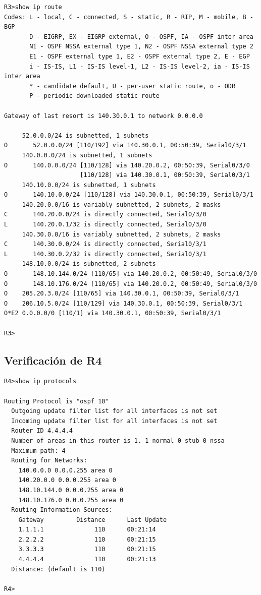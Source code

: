 \documentclass[12pt,a4paper]{article}
\begin{document}
\begin{verbatim}
R3>show ip route
Codes: L - local, C - connected, S - static, R - RIP, M - mobile, B - BGP
       D - EIGRP, EX - EIGRP external, O - OSPF, IA - OSPF inter area
       N1 - OSPF NSSA external type 1, N2 - OSPF NSSA external type 2
       E1 - OSPF external type 1, E2 - OSPF external type 2, E - EGP
       i - IS-IS, L1 - IS-IS level-1, L2 - IS-IS level-2, ia - IS-IS inter area
       * - candidate default, U - per-user static route, o - ODR
       P - periodic downloaded static route

Gateway of last resort is 140.30.0.1 to network 0.0.0.0

     52.0.0.0/24 is subnetted, 1 subnets
O       52.0.0.0/24 [110/192] via 140.30.0.1, 00:50:39, Serial0/3/1
     140.0.0.0/24 is subnetted, 1 subnets
O       140.0.0.0/24 [110/128] via 140.20.0.2, 00:50:39, Serial0/3/0
                     [110/128] via 140.30.0.1, 00:50:39, Serial0/3/1
     140.10.0.0/24 is subnetted, 1 subnets
O       140.10.0.0/24 [110/128] via 140.30.0.1, 00:50:39, Serial0/3/1
     140.20.0.0/16 is variably subnetted, 2 subnets, 2 masks
C       140.20.0.0/24 is directly connected, Serial0/3/0
L       140.20.0.1/32 is directly connected, Serial0/3/0
     140.30.0.0/16 is variably subnetted, 2 subnets, 2 masks
C       140.30.0.0/24 is directly connected, Serial0/3/1
L       140.30.0.2/32 is directly connected, Serial0/3/1
     148.10.0.0/24 is subnetted, 2 subnets
O       148.10.144.0/24 [110/65] via 140.20.0.2, 00:50:49, Serial0/3/0
O       148.10.176.0/24 [110/65] via 140.20.0.2, 00:50:49, Serial0/3/0
O    205.20.3.0/24 [110/65] via 140.30.0.1, 00:50:39, Serial0/3/1
O    206.10.5.0/24 [110/129] via 140.30.0.1, 00:50:39, Serial0/3/1
O*E2 0.0.0.0/0 [110/1] via 140.30.0.1, 00:50:39, Serial0/3/1

R3>
\end{verbatim}

\subsection{Verificación de R4}

\begin{verbatim}
R4>show ip protocols

Routing Protocol is "ospf 10"
  Outgoing update filter list for all interfaces is not set 
  Incoming update filter list for all interfaces is not set 
  Router ID 4.4.4.4
  Number of areas in this router is 1. 1 normal 0 stub 0 nssa
  Maximum path: 4
  Routing for Networks:
    140.0.0.0 0.0.0.255 area 0
    140.20.0.0 0.0.0.255 area 0
    148.10.144.0 0.0.0.255 area 0
    148.10.176.0 0.0.0.255 area 0
  Routing Information Sources:  
    Gateway         Distance      Last Update 
    1.1.1.1              110      00:21:14
    2.2.2.2              110      00:21:15
    3.3.3.3              110      00:21:15
    4.4.4.4              110      00:21:13
  Distance: (default is 110)

R4>
\end{verbatim}
\end{document}
